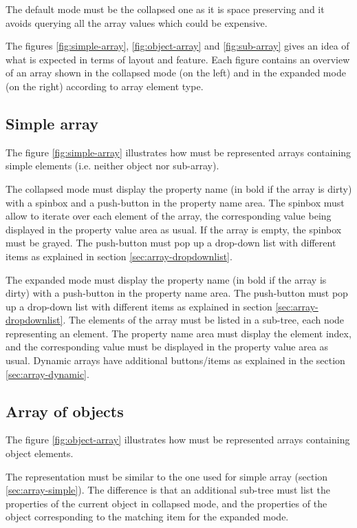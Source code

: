 \documentclass[a4paper, twoside]{report}
\begin{document}
The default mode must be the collapsed one as it is space preserving and it avoids querying all the
array values which could be expensive.

The figures \ref{fig:simple-array}, \ref{fig:object-array} and \ref{fig:sub-array} gives an idea of
what is expected in terms of layout and feature. Each figure contains an overview of an array shown
in the collapsed mode (on the left) and in the expanded mode (on the right) according to array
element type.

\subsection{Simple array\label{sec:array-simple}}

The figure \ref{fig:simple-array} illustrates how must be represented arrays containing simple
elements (i.e. neither object nor sub-array).

The collapsed mode must display the property name (in bold if the array is dirty) with a spinbox and
a push-button in the property name area. The spinbox must allow to iterate
over each element of the array, the corresponding value being displayed in the property value area
as usual. If the array is empty, the spinbox must be grayed. The push-button must pop up a
drop-down list with different items as explained in section \ref{sec:array-dropdownlist}.

The expanded mode must display the property name (in bold if the array is dirty) with a push-button
in the property name area. The push-button must pop up a drop-down list with different items as
explained in section \ref{sec:array-dropdownlist}. The elements of the array must be listed in a
sub-tree, each node representing an element. The property name area must display the element
index, and the corresponding value must be displayed in the property value area as usual. Dynamic
arrays have additional buttons/items as explained in the section \ref{sec:array-dynamic}.


\subsection{Array of objects\label{sec:array-object}}

The figure \ref{fig:object-array} illustrates how must be represented arrays containing object
elements.

The representation must be similar to the one used for simple array (section
\ref{sec:array-simple}). The difference is that an additional sub-tree must list the properties of the
current object in collapsed mode, and the properties of the object corresponding to the matching
item for the expanded mode.
\end{document}
